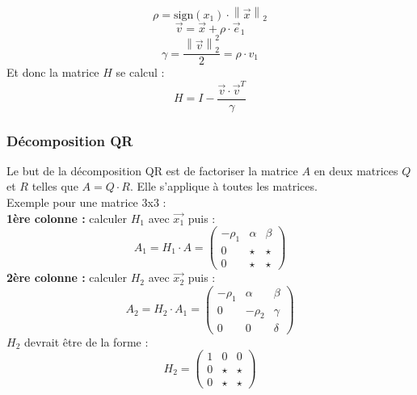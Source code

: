 \begin{equation}
    \rho = \text{sign}(x_1)\cdot \left \|  \overrightarrow{x}\right \|_2
    \nonumber
\end{equation}
\begin{equation}
    \overrightarrow{v} = \overrightarrow{x}+\rho\cdot \overrightarrow{e}_1
    \nonumber
\end{equation}
\begin{equation}
    \gamma = \frac{\left \| \overrightarrow{v} \right \|_2^2}{2}=\rho\cdot v_1
    \nonumber
\end{equation}
Et donc la matrice $H$ se calcul :
\begin{equation}
    H=I-\frac{\overrightarrow{v}\cdot \overrightarrow{v}^T}{\gamma}
    \nonumber
\end{equation}
\subsubsection*{Décomposition QR}
\noindent
Le but de la décomposition QR est de factoriser la matrice $A$ en
deux matrices $Q$ et $R$ telles que $A=Q\cdot R$. Elle s'applique à toutes les
matrices.\\
Exemple pour une matrice 3x3 :\\
\textbf{1ère colonne :}
calculer $H_1$ avec $\overrightarrow{x_1}$ puis :
\begin{equation}
    A_1=H_1\cdot A = \begin{pmatrix}
        -\rho_1 & \alpha & \beta \\
        0       & \star  & \star \\
        0       & \star  & \star
    \end{pmatrix}
    \nonumber
\end{equation}
\textbf{2ère colonne :}
calculer $H_2$ avec $\overrightarrow{x_2}$ puis :
\begin{equation}
    A_2=H_2\cdot A_1 = \begin{pmatrix}
        -\rho_1 & \alpha  & \beta  \\
        0       & -\rho_2 & \gamma \\
        0       & 0       & \delta
    \end{pmatrix}
    \nonumber
\end{equation}
$H_2$ devrait être de la forme :
\begin{equation}
    H_2=\begin{pmatrix}
        1 & 0     & 0     \\
        0 & \star & \star \\
        0 & \star & \star
    \end{pmatrix}
    \nonumber
\end{equation}
